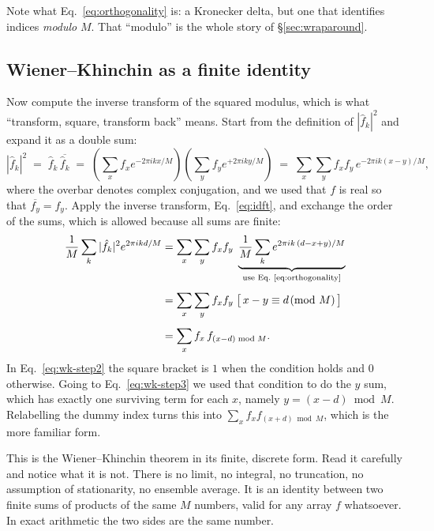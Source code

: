 \documentclass[12pt]{article}
\begin{document}
Note what Eq.~\eqref{eq:orthogonality} is: a Kronecker delta, but one that
identifies indices \emph{modulo} $M$.  That ``modulo'' is the whole story of
\S\ref{sec:wraparound}.

\subsection{Wiener--Khinchin as a finite identity}\label{sec:wk}

Now compute the inverse transform of the squared modulus, which is what
``transform, square, transform back'' means.  Start from the definition of
$|\hat f_k|^2$ and expand it as a double sum:
\begin{equation}\label{eq:modsq}
  |\hat f_k|^2
  \;=\; \hat f_k\, \overline{\hat f_k}
  \;=\; \left(\sum_x f_x e^{-2\pi i k x / M}\right)
        \left(\sum_y f_y e^{+2\pi i k y / M}\right)
  \;=\; \sum_x \sum_y f_x f_y\, e^{-2\pi i k (x-y)/M} ,
\end{equation}
where the overbar denotes complex conjugation, and we used that $f$ is real
so that $\overline{f_y} = f_y$.  Apply the inverse transform,
Eq.~\eqref{eq:idft}, and exchange the order of the sums, which is allowed
because all sums are finite:
\begin{align}
  \frac{1}{M}\sum_k |\hat f_k|^2 e^{2\pi i k d / M}
  &= \sum_x \sum_y f_x f_y \;
     \underbrace{\frac{1}{M}\sum_k e^{2\pi i k\,(d - x + y)/M}}_{\text{use Eq.~\eqref{eq:orthogonality}}}
     \label{eq:wk-step1}\\[4pt]
  &= \sum_x \sum_y f_x f_y \;
     \big[\, x - y \equiv d \!\!\pmod M \,\big]
     \label{eq:wk-step2}\\[4pt]
  &= \sum_x f_x\, f_{(x-d) \bmod M} .
     \label{eq:wk-step3}
\end{align}
In Eq.~\eqref{eq:wk-step2} the square bracket is $1$ when the condition
holds and $0$ otherwise.  Going to Eq.~\eqref{eq:wk-step3} we used that
condition to do the $y$ sum, which has exactly one surviving term for each
$x$, namely $y = (x-d) \bmod M$.  Relabelling the dummy index turns this into
$\sum_x f_x f_{(x+d) \bmod M}$, which is the more familiar form.

This is the Wiener--Khinchin theorem in its finite, discrete form.  Read it
carefully and notice what it is not.  There is no limit, no integral, no
truncation, no assumption of stationarity, no ensemble average.  It is an
identity between two finite sums of products of the same $M$ numbers, valid
for any array $f$ whatsoever.  In exact arithmetic the two sides are the same
number.
\end{document}
